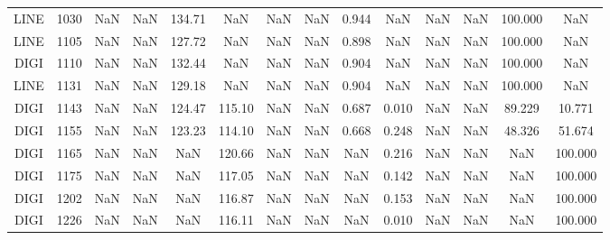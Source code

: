 \begin{table}[h]
\begin{tabular}{cccccccccccccc}
		LINE & 1030   & NaN    & NaN    & 134.71 & NaN    & NaN   & NaN   & 0.944 & NaN   & NaN    & NaN    & 100.000 & NaN     \\
		\rowcolor[HTML]{EFEFEF} 
		LINE & 1105   & NaN    & NaN    & 127.72 & NaN    & NaN   & NaN   & 0.898 & NaN   & NaN    & NaN    & 100.000 & NaN     \\
		DIGI & 1110   & NaN    & NaN    & 132.44 & NaN    & NaN   & NaN   & 0.904 & NaN   & NaN    & NaN    & 100.000 & NaN     \\
		\rowcolor[HTML]{EFEFEF} 
		LINE & 1131   & NaN    & NaN    & 129.18 & NaN    & NaN   & NaN   & 0.904 & NaN   & NaN    & NaN    & 100.000 & NaN     \\
		DIGI & 1143   & NaN    & NaN    & 124.47 & 115.10 & NaN   & NaN   & 0.687 & 0.010 & NaN    & NaN    & 89.229  & 10.771  \\
		\rowcolor[HTML]{EFEFEF} 
		DIGI & 1155   & NaN    & NaN    & 123.23 & 114.10 & NaN   & NaN   & 0.668 & 0.248 & NaN    & NaN    & 48.326  & 51.674  \\
		DIGI & 1165   & NaN    & NaN    & NaN    & 120.66 & NaN   & NaN   & NaN   & 0.216 & NaN    & NaN    & NaN     & 100.000 \\
		\rowcolor[HTML]{EFEFEF} 
		DIGI & 1175   & NaN    & NaN    & NaN    & 117.05 & NaN   & NaN   & NaN   & 0.142 & NaN    & NaN    & NaN     & 100.000 \\
		DIGI & 1202   & NaN    & NaN    & NaN    & 116.87 & NaN   & NaN   & NaN   & 0.153 & NaN    & NaN    & NaN     & 100.000 \\
		\rowcolor[HTML]{EFEFEF} 
		DIGI & 1226   & NaN    & NaN    & NaN    & 116.11 & NaN   & NaN   & NaN   & 0.010 & NaN    & NaN    & NaN     & 100.000 \\ \hline
	\end{tabular}
\end{table}